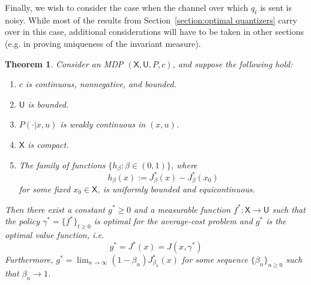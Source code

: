 \documentclass[conference, draftcls, onecolumn]{IEEEtran}
\newtheorem{theorem}{Theorem}
\begin{document}
Finally, we wish to consider the case when the channel over which \(q_t\) is sent is noisy. While most of the results from Section~\ref{section:optimal quantizers} carry over in this case, additional considerations will have to be taken in other sections (e.g. in proving uniqueness of the invariant measure).

\appendix

\begin{theorem}\cite[Theorem 3.3]{NearOptimalityQuantized}\label{theorem:ACOE}
    Consider an MDP \((\mathsf{X}, \mathsf{U}, P, c)\), and suppose the following hold:
    \begin{enumerate}
        \item \(c\) is continuous, nonnegative, and bounded.
        \item \(\mathsf{U}\) is bounded.
        \item \(P(\cdot | x,u)\) is weakly continuous in \((x,u)\).
        \item \(\mathsf{X}\) is compact.
        \item The family of functions \(\{h_\beta : \beta \in (0,1)\}\), where
              \[h_\beta(x) := J^*_\beta(x) - J^*_\beta(x_0)\]
              for some fixed \(x_0 \in \mathsf{X}\), is uniformly bounded  and equicontinuous.
    \end{enumerate}
    Then there exist a constant \(g^* \ge 0\) and a measurable function \(f^* : \mathsf{X} \to \mathsf{U}\) such that the policy \(\gamma^* = \{f^*\}_{t\ge0}\) is optimal for the average-cost problem and \(g^*\) is the optimal value function, i.e.
    \[g^* = J^*(x) = J(x, \gamma^*)\]
    Furthermore, \(g^* = \lim_{n \to \infty}(1-\beta_n)J^*_{\beta_n}(x)\) for some sequence \(\{\beta_n\}_{n \ge 0}\) such that \(\beta_n \to 1\).
\end{theorem}
\end{document}
